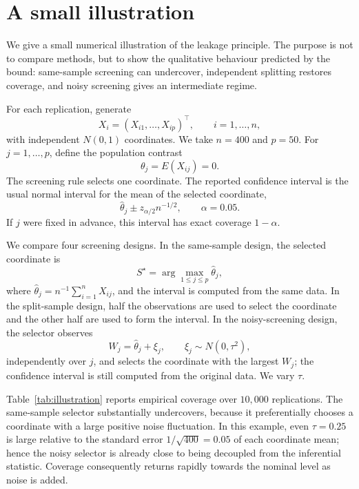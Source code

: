 \documentclass[11pt]{article}
\begin{document}
\section{A small illustration}
\label{sec:illustration}

We give a small numerical illustration of the leakage principle. The purpose is not to compare methods, but to show the qualitative behaviour predicted by the bound: same-sample screening can undercover, independent splitting restores coverage, and noisy screening gives an intermediate regime.

For each replication, generate
\[
X_i=(X_{i1},\ldots,X_{ip})^\top,\qquad i=1,\ldots,n,
\]
with independent \(N(0,1)\) coordinates. We take \(n=400\) and \(p=50\). For \(j=1,\ldots,p\), define the population contrast
\[
\theta_j=E(X_{ij})=0.
\]
The screening rule selects one coordinate. The reported confidence interval is the usual normal interval for the mean of the selected coordinate,
\[
\widehat\theta_j\pm z_{\alpha/2}n^{-1/2},
\qquad \alpha=0.05.
\]
If \(j\) were fixed in advance, this interval has exact coverage \(1-\alpha\).

We compare four screening designs. In the same-sample design, the selected coordinate is
\[
S^\star=\arg\max_{1\leq j\leq p}\widehat\theta_j,
\]
where \(\widehat\theta_j=n^{-1}\sum_{i=1}^n X_{ij}\), and the interval is
computed from the same data. In the split-sample design, half the observations are used to select the coordinate and the other half are used to form the interval. In the noisy-screening design, the selector observes
\[
W_j=\widehat\theta_j+\xi_j,\qquad
\xi_j\sim N(0,\tau^2),
\]
independently over \(j\), and selects the coordinate with the largest \(W_j\); the confidence interval is still computed from the original data. We vary
\(\tau\).

Table~\ref{tab:illustration} reports empirical coverage over \(10,000\) replications. The same-sample selector substantially undercovers, because it preferentially chooses a coordinate with a large positive noise fluctuation. In this example, even \(\tau=0.25\) is large relative to the standard error \(1/\sqrt{400}=0.05\) of each coordinate mean; hence the noisy selector is already close to being decoupled from the inferential statistic. Coverage consequently returns rapidly
towards the nominal level as noise is added. 
\end{document}
